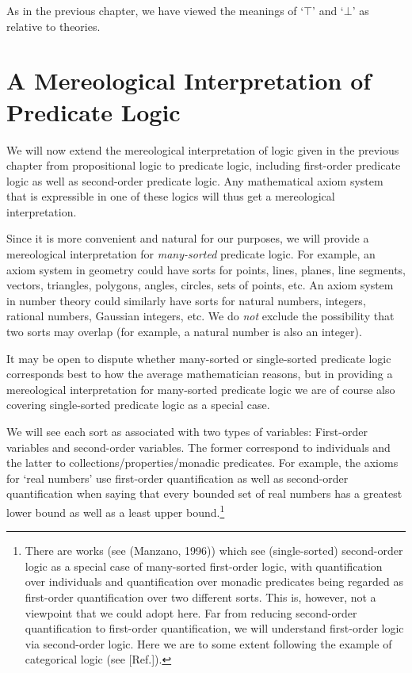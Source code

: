 \documentclass[12pt]{book}
\begin{document}
As in the previous chapter, we have viewed the meanings of `$\top$' and `$\bot$' as relative to theories.

\vspace{4\baselineskip}

\newpage

\chapter{A Mereological Interpretation of Predicate Logic} \label{interpretation_of_predicate_logic}
We will now extend the mereological interpretation of logic given in the previous chapter from propositional logic to predicate logic, including first-order predicate logic as well as second-order predicate logic. Any mathematical axiom system that is expressible in one of these logics will thus get a mereological interpretation.

Since it is more convenient and natural for our purposes, we will provide a mereological interpretation for \textit{many-sorted} predicate logic. For example, an axiom system in geometry could have sorts for points, lines, planes, line segments, vectors, triangles, polygons, angles, circles, sets of points, etc. An axiom system in number theory could similarly have sorts for natural numbers, integers, rational numbers, Gaussian integers, etc. We do \textit{not} exclude the possibility that two sorts may overlap (for example, a natural number is also an integer).

It may be open to dispute whether many-sorted or single-sorted predicate logic corresponds best to how the average mathematician reasons, but in providing a mereological interpretation for many-sorted predicate logic we are of course also covering single-sorted predicate logic as a special case.

We will see each sort as associated with two types of variables: First-order variables and second-order variables. The former correspond to individuals and the latter to collections/properties/monadic predicates.  For example, the axioms for `real numbers' use first-order quantification as well as second-order quantification when saying that every bounded set of real numbers has a greatest lower bound as well as a least upper bound.\footnote{There are works (see (Manzano, 1996)) which see (single-sorted) second-order logic as a special case of many-sorted first-order logic, with quantification over individuals and quantification over monadic predicates being regarded as first-order quantification over two different sorts. This is, however, not a viewpoint that we could adopt here. Far from reducing second-order quantification to first-order quantification, we will understand first-order logic via second-order logic. Here we are to some extent following the example of categorical logic (see [Ref.]).}
\end{document}
